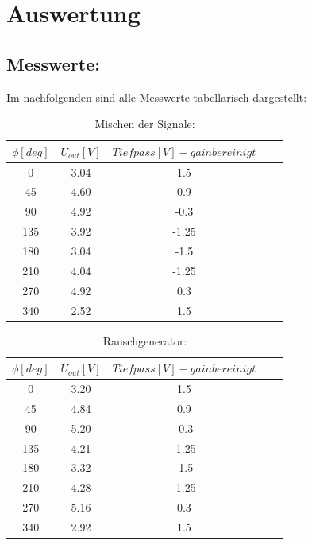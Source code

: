 \section{Auswertung}
\label{sec:Auswertung}

\subsection{Messwerte:}
Im nachfolgenden sind alle Messwerte tabellarisch dargestellt:
\begin{table}
\centering
\caption{Mischen der Signale:}
\label{tab:data2}
\begin{tabular}{S[table-format=3.0] S S S S[table-format=3.2]}
\toprule
{$\phi [deg]$} & {$U_{out}[V]$} & {$Tiefpass [V] - gainbereinigt$}\\
 & 3.04 & 1.5 \\
45 & 4.60 & 0.9 \\
90 & 4.92 & -0.3 \\
135 & 3.92 & -1.25 \\
180 & 3.04 & -1.5 \\
210 & 4.04 & -1.25 \\
270 & 4.92 & 0.3 \\
340 & 2.52 & 1.5 \\
\bottomrule
\end{tabular}
\end{table}

\begin{table}
\centering
\caption{Rauschgenerator:}
\label{tab:data3}
\begin{tabular}{S[table-format=3.0] S S S S[table-format=3.2]}
\toprule
{$\phi [deg]$} & {$U_{out}[V]$} & {$Tiefpass [V ]- gainbereinigt$}\\
 & 3.20 & 1.5 \\
45 & 4.84 & 0.9 \\
90 & 5.20 & -0.3 \\
135 & 4.21 & -1.25 \\
180 & 3.32 & -1.5 \\
210 & 4.28 & -1.25 \\
270 & 5.16 & 0.3 \\
340 & 2.92 & 1.5 \\
\bottomrule
\end{tabular}
\end{table}

